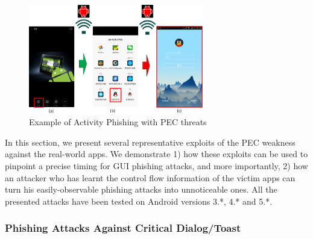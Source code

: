 \begin{figure}
\centering
\includegraphics[width = 3.0in]{pic5.png}
\caption{\label{}Example of Activity Phishing with PEC threats}
\end{figure}


In this section, we present several representative exploits of the PEC weakness against the real-world apps. 
We demonstrate 1) how these exploits can be used to 
pinpoint a precise timing for GUI phishing attacks, and more importantly, 
2) how an attacker who has learnt the control flow information of the victim apps 
 can turn his easily-observable phishing attacks into unnoticeable ones. 
All the presented attacks have been tested on Android versions 3.*, 4.* and 5.*. 




\subsubsection{Phishing Attacks Against Critical Dialog/Toast} \label{subsubsec:dialogattack}


